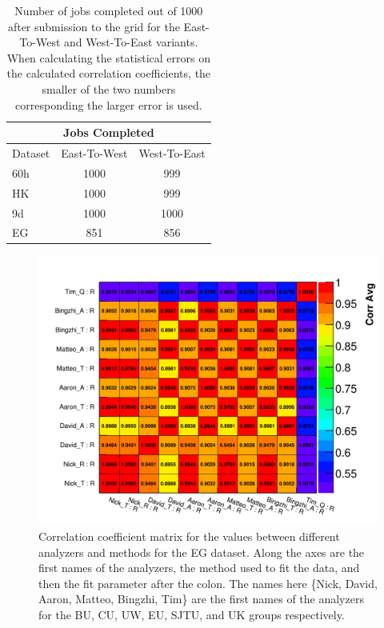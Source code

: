 \begin{table}[h]
\centering
\renewcommand{\arraystretch}{1.2}
\begin{tabularx}{0.4\linewidth}{@{\extracolsep{\fill}}lcc}
  \hline
    \multicolumn{3}{c}{\textbf{Jobs Completed}} \\
  \hline
  	Dataset & East-To-West & West-To-East \\
  \hline
  	60h & 1000 & 999 \\
  	HK & 1000 & 999 \\
  	9d & 1000 & 1000 \\
  	EG & 851 & 856 \\ 
  \hline
\end{tabularx}
\caption[]{Number of jobs completed out of 1000 after submission to the grid for the East-To-West and West-To-East variants. When calculating the statistical errors on the calculated correlation coefficients, the smaller of the two numbers corresponding the larger error is used.}
\label{tab:jobs}
\end{table}



\begin{figure}[]
\centering
\includegraphics[width=\textwidth]{Avg_CorrelationMatrix_R_R}
\caption{Correlation coefficient matrix for the \R values between different analyzers and methods for the EG dataset. Along the axes are the first names of the analyzers, the method used to fit the data, and then the fit parameter after the colon. The names here \{Nick, David, Aaron, Matteo, Bingzhi, Tim\} are the first names of the analyzers for the BU, CU, UW, EU, SJTU, and UK groups respectively.}
\label{fig:corrMatAnalyzer}
\end{figure}


